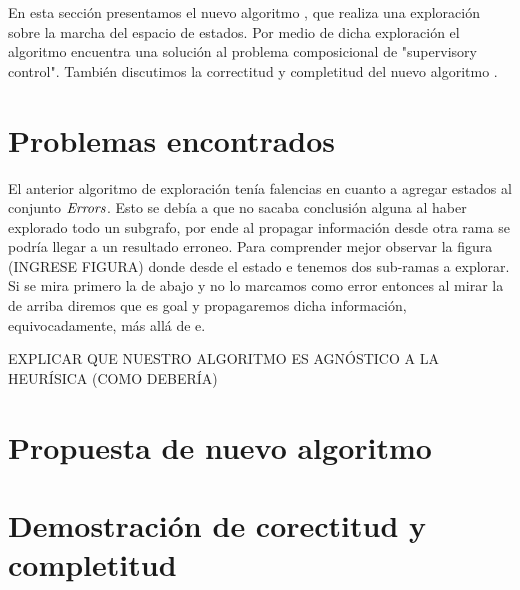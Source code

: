 En esta sección presentamos el nuevo algoritmo \DCS, que realiza una exploración sobre la marcha del espacio de estados. Por medio de dicha exploración el algoritmo encuentra una solución al problema composicional de "supervisory control". También discutimos la correctitud y completitud del nuevo algoritmo \DCS. \\

\section{Problemas encontrados}
El anterior algoritmo de exploración tenía falencias en cuanto a agregar estados al conjunto $\mathit{Errors}$. Esto se debía a que no sacaba conclusión alguna al haber explorado todo un subgrafo, por ende al propagar información desde otra rama se podría llegar a un resultado erroneo. Para comprender mejor observar la figura (INGRESE FIGURA) donde desde el estado e tenemos dos sub-ramas a explorar. Si se mira primero la de abajo y no lo marcamos como error entonces al mirar la de arriba diremos que es goal y propagaremos dicha información, equivocadamente, más allá de e.

EXPLICAR QUE NUESTRO ALGORITMO ES AGNÓSTICO A LA HEURÍSICA (COMO DEBERÍA)

\section{Propuesta de nuevo algoritmo}



\section{Demostración de corectitud y completitud}

